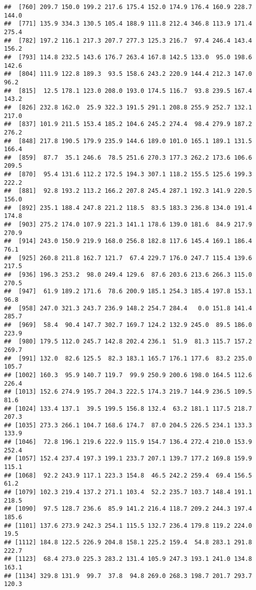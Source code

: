 \documentclass[]{article}
\begin{document}
\begin{verbatim}
##  [760] 209.7 150.0 199.2 217.6 175.4 152.0 174.9 176.4 160.9 228.7 144.0
##  [771] 135.9 334.3 130.5 105.4 188.9 111.8 212.4 346.8 113.9 171.4 275.4
##  [782] 197.2 116.1 217.3 207.7 277.3 125.3 216.7  97.4 246.4 143.4 156.2
##  [793] 114.8 232.5 143.6 176.7 263.4 167.8 142.5 133.0  95.0 198.6 142.6
##  [804] 111.9 122.8 189.3  93.5 158.6 243.2 220.9 144.4 212.3 147.0  96.2
##  [815]  12.5 178.1 123.0 208.0 193.0 174.5 116.7  93.8 239.5 167.4 143.2
##  [826] 232.8 162.0  25.9 322.3 191.5 291.1 208.8 255.9 252.7 132.1 217.0
##  [837] 101.9 211.5 153.4 185.2 104.6 245.2 274.4  98.4 279.9 187.2 276.2
##  [848] 217.8 190.5 179.9 235.9 144.6 189.0 101.0 165.1 189.1 131.5 166.4
##  [859]  87.7  35.1 246.6  78.5 251.6 270.3 177.3 262.2 173.6 106.6 209.5
##  [870]  95.4 131.6 112.2 172.5 194.3 307.1 118.2 155.5 125.6 199.3 222.2
##  [881]  92.8 193.2 113.2 166.2 207.8 245.4 287.1 192.3 141.9 220.5 156.0
##  [892] 235.1 188.4 247.8 221.2 118.5  83.5 183.3 236.8 134.0 191.4 174.8
##  [903] 275.2 174.0 107.9 221.3 141.1 178.6 139.0 181.6  84.9 217.9 270.9
##  [914] 243.0 150.9 219.9 168.0 256.8 182.8 117.6 145.4 169.1 186.4  76.1
##  [925] 260.8 211.8 162.7 121.7  67.4 229.7 176.0 247.7 115.4 139.6 217.5
##  [936] 196.3 253.2  98.0 249.4 129.6  87.6 203.6 213.6 266.3 115.0 270.5
##  [947]  61.9 189.2 171.6  78.6 200.9 185.1 254.3 185.4 197.8 153.1  96.8
##  [958] 247.0 321.3 243.7 236.9 148.2 254.7 284.4   0.0 151.8 141.4 285.7
##  [969]  58.4  90.4 147.7 302.7 169.7 124.2 132.9 245.0  89.5 186.0 223.9
##  [980] 179.5 112.0 245.7 142.8 202.4 236.1  51.9  81.3 115.7 157.2 269.7
##  [991] 132.0  82.6 125.5  82.3 183.1 165.7 176.1 177.6  83.2 235.0 105.7
## [1002] 160.3  95.9 140.7 119.7  99.9 250.9 200.6 198.0 164.5 112.6 226.4
## [1013] 152.6 274.9 195.7 204.3 222.5 174.3 219.7 144.9 236.5 109.5  81.6
## [1024] 133.4 137.1  39.5 199.5 156.8 132.4  63.2 181.1 117.5 218.7 207.3
## [1035] 273.3 266.1 104.7 168.6 174.7  87.0 204.5 226.5 234.1 133.3 133.9
## [1046]  72.8 196.1 219.6 222.9 115.9 154.7 136.4 272.4 210.0 153.9 252.4
## [1057] 152.4 237.4 197.3 199.1 233.7 207.1 139.7 177.2 169.8 159.9 115.1
## [1068]  92.2 243.9 117.1 223.3 154.8  46.5 242.2 259.4  69.4 156.5  61.2
## [1079] 102.3 219.4 137.2 271.1 103.4  52.2 235.7 103.7 148.4 191.1 218.5
## [1090]  97.5 128.7 236.6  85.9 141.2 216.4 118.7 209.2 244.3 197.4 185.6
## [1101] 137.6 273.9 242.3 254.1 115.5 132.7 236.4 179.8 119.2 224.0  19.5
## [1112] 184.8 122.5 226.9 204.8 158.1 225.2 159.4  54.8 283.1 291.8 222.7
## [1123]  68.4 273.0 225.3 283.2 131.4 105.9 247.3 193.1 241.0 134.8 163.1
## [1134] 329.8 131.9  99.7  37.8  94.8 269.0 268.3 198.7 201.7 293.7 120.3

\end{verbatim}
\end{document}
